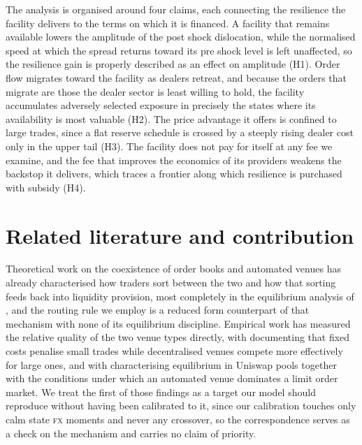 \documentclass[a4paper,fleqn]{cas-sc}
\newcommand{\acro}[1]{\textsc{\MakeLowercase{#1}}\xspace}
\newcommand{\FX}{\acro{FX}}
\begin{document}
The analysis is organised around four claims, each connecting the resilience the facility delivers to the terms on which it is financed. A facility that remains available lowers the amplitude of the post shock dislocation, while the normalised speed at which the spread returns toward its pre shock level is left unaffected, so the resilience gain is properly described as an effect on amplitude (H1). Order flow migrates toward the facility as dealers retreat, and because the orders that migrate are those the dealer sector is least willing to hold, the facility accumulates adversely selected exposure in precisely the states where its availability is most valuable (H2). The price advantage it offers is confined to large trades, since a flat reserve schedule is crossed by a steeply rising dealer cost only in the upper tail (H3). The facility does not pay for itself at any fee we examine, and the fee that improves the economics of its providers weakens the backstop it delivers, which traces a frontier along which resilience is purchased with subsidy (H4).

\section{Related literature and contribution}
\label{sec:lit}

Theoretical work on the coexistence of order books and automated venues has already characterised how traders sort between the two and how that sorting feeds back into liquidity provision, most completely in the equilibrium analysis of \citet{coexisting}, and the routing rule we employ is a reduced form counterpart of that mechanism with none of its equilibrium discipline. Empirical work has measured the relative quality of the two venue types directly, with \citet{barbon2023} documenting that fixed costs penalise small trades while decentralised venues compete more effectively for large ones, and with \citet{lehar2024} characterising equilibrium in Uniswap pools together with the conditions under which an automated venue dominates a limit order market. We treat the first of those findings as a target our model should reproduce without having been calibrated to it, since our calibration touches only calm state \FX{} moments and never any crossover, so the correspondence serves as a check on the mechanism and carries no claim of priority.
\end{document}
